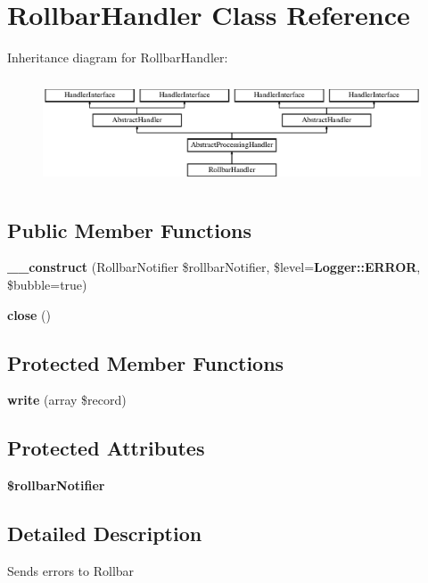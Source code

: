 \section{Rollbar\+Handler Class Reference}
\label{class_monolog_1_1_handler_1_1_rollbar_handler}
Inheritance diagram for Rollbar\+Handler\+:\begin{figure}[H]
\begin{center}
\leavevmode
\includegraphics[height=3.200000cm]{class_monolog_1_1_handler_1_1_rollbar_handler}
\end{center}
\end{figure}
\subsection*{Public Member Functions}
\begin{DoxyCompactItemize}
\item 
{\bf \+\_\+\+\_\+construct} (Rollbar\+Notifier \$rollbar\+Notifier, \$level={\bf Logger\+::\+E\+R\+R\+O\+R}, \$bubble=true)
\item 
{\bf close} ()
\end{DoxyCompactItemize}
\subsection*{Protected Member Functions}
\begin{DoxyCompactItemize}
\item 
{\bf write} (array \$record)
\end{DoxyCompactItemize}
\subsection*{Protected Attributes}
\begin{DoxyCompactItemize}
\item 
{\bf \$rollbar\+Notifier}
\end{DoxyCompactItemize}


\subsection{Detailed Description}
Sends errors to Rollbar

